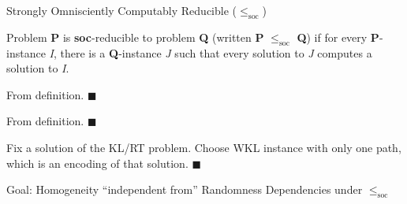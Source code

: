 \begin{frame}{Strongly Omnisciently Computably Reducible
($\leq_{\text{soc}}$)}
  \begin{define*}
    Problem \textbf{P} is \textbf{soc}-reducible to problem \textbf{Q}
    (written \textbf{P} $\leq_{\text{soc}}$ \textbf{Q}) if for every
    \textbf{P}-instance \textit{I}, there is a \textbf{Q}-instance
    \textit{J} such that every solution to \textit{J} computes a solution
    to \textit{I}.
  \end{define*}

  \begin{observe*}
    From definition. $\blacksquare$
  \end{observe*}

  \begin{observe*}
    From definition. $\blacksquare$
  \end{observe*}

  \begin{observe*}
    Fix a solution of the KL/RT problem. Choose WKL instance with only
    one path, which is an encoding of that solution. $\blacksquare$
  \end{observe*}
\end{frame}

\begin{frame}{Goal: Homogeneity ``independent from'' Randomness}
  Dependencies under $\leq_{\text{soc}}$

  \vspace{2em}
  \begin{center}
  \end{center}
\end{frame}
